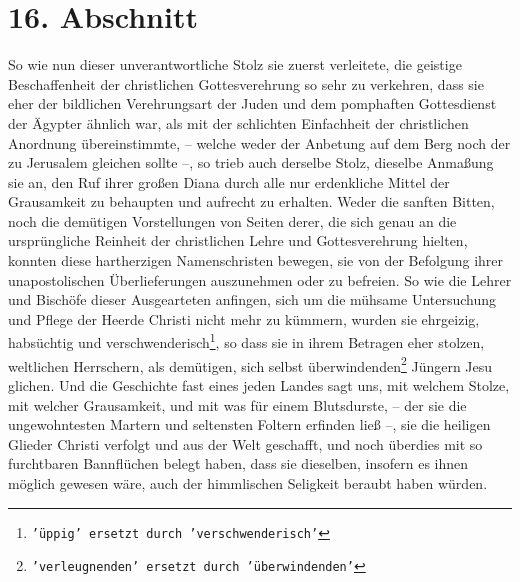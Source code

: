 \section{16. Abschnitt} \label{kap7_ab16}

So wie nun dieser unverantwortliche Stolz sie zuerst verleitete, die geistige
Beschaffenheit der christlichen Gottesverehrung so sehr
zu verkehren, dass sie
eher der bildlichen Verehrungsart der Juden und dem
pomphaften Gottesdienst
der Ägypter ähnlich war, als mit der schlichten
Einfachheit der christlichen
Anordnung übereinstimmte, -- welche weder der Anbetung auf dem Berg noch der zu
Jerusalem gleichen sollte --, so trieb auch derselbe
Stolz, dieselbe
Anmaßung sie an, den Ruf ihrer großen Diana durch alle
nur erdenkliche
Mittel der Grausamkeit zu behaupten und aufrecht zu erhalten. Weder die sanften
Bitten, noch die demütigen Vorstellungen von Seiten derer, die sich genau an
die ursprüngliche Reinheit der christlichen Lehre und
Gottesverehrung hielten,
konnten diese hartherzigen Namenschristen
bewegen, sie von der Befolgung ihrer
unapostolischen Überlieferungen
auszunehmen oder zu befreien. So wie die Lehrer
und Bischöfe dieser Ausgearteten anfingen, sich um die
mühsame Untersuchung und
Pflege der Heerde Christi nicht mehr zu kümmern, wurden sie ehrgeizig,
habsüchtig und verschwenderisch\footnote{\texttt{'üppig' ersetzt durch
'verschwenderisch'}}, so dass sie in ihrem Betragen eher stolzen, weltlichen
Herrschern, als demütigen, sich selbst
überwindenden\footnote{\texttt{'verleugnenden' ersetzt durch 'überwindenden'}}
Jüngern Jesu glichen.
Und die Geschichte fast eines jeden Landes sagt uns, mit welchem Stolze, mit
welcher Grausamkeit, und mit was für einem Blutsdurste, --
der sie die
ungewohntesten Martern und seltensten Foltern erfinden
ließ --, sie die
heiligen Glieder Christi
verfolgt und aus der Welt geschafft, und noch
überdies mit so furchtbaren Bannflüchen belegt haben, dass sie
dieselben,
insofern es ihnen möglich gewesen wäre, auch der himmlischen
Seligkeit beraubt
haben würden.

\medskip

